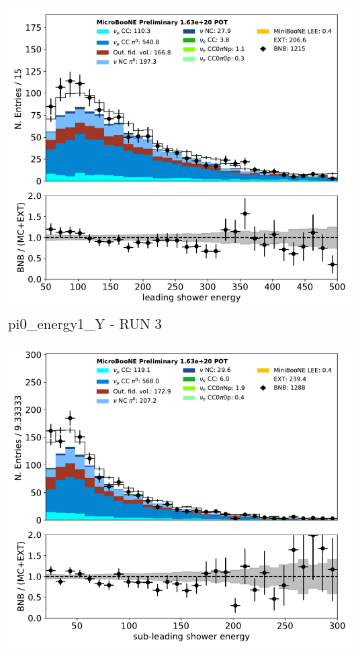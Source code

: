 \documentclass[a4paper]{article}
\begin{document}
\begin{figure}[H] 
\begin{center}
    \begin{subfigure}[b]{0.3\textwidth}
    \centering
    \includegraphics[width=1.00\textwidth]{pi0/pi0_energy1_Y_01152020_inputs_RUN3.pdf}
    \caption{\label{fig:pi0:inputs:energy1:RUN3} pi0\_energy1\_Y - RUN 3}
    \end{subfigure}
    \begin{subfigure}[b]{0.3\textwidth}
    \centering
    \includegraphics[width=1.00\textwidth]{pi0/pi0_energy2_Y_01152020_inputs_RUN3.pdf}

\end{subfigure}
\end{center}
\end{figure}
\end{document}
